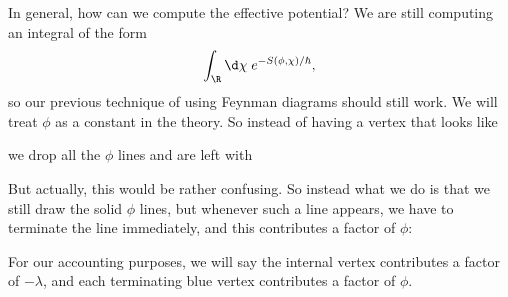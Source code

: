 \documentclass[a4paper]{article}
\begin{document}
In general, how can we compute the effective potential? We are still computing an integral of the form
\[
  \int_\R \d \chi\; e^{-S(\phi, \chi)/\hbar},
\]
so our previous technique of using Feynman diagrams should still work. We will treat $\phi$ as a constant in the theory. So instead of having a vertex that looks like
\begin{center}
\end{center}
we drop all the $\phi$ lines and are left with
\begin{center}
\end{center}
But actually, this would be rather confusing. So instead what we do is that we still draw the solid $\phi$ lines, but whenever such a line appears, we have to terminate the line immediately, and this contributes a factor of $\phi$:
\begin{center}
\end{center}
For our accounting purposes, we will say the internal vertex contributes a factor of $-\lambda$, and each terminating blue vertex contributes a factor of $\phi$.
\end{document}
